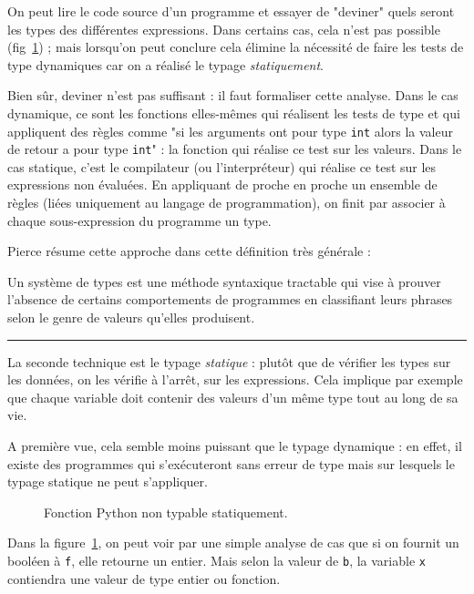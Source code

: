 
On peut lire le code source d'un programme et essayer de "deviner" quels seront
les types des différentes expressions. Dans certains cas, cela n'est pas
possible (fig~\ref{fig:nontypable}) ; mais lorsqu'on peut conclure cela élimine
la nécessité de faire les tests de type dynamiques car on a réalisé le typage
\emph{statiquement}.

Bien sûr, deviner n'est pas suffisant : il faut formaliser cette analyse. Dans
le cas dynamique, ce sont les fonctions elles-mêmes qui réalisent les tests de
type et qui appliquent des règles comme "si les arguments ont pour type
\texttt{int} alors la valeur de retour a pour type \texttt{int}" : la fonction
qui réalise ce test sur les valeurs. Dans le cas statique, c'est le compilateur
(ou l'interpréteur) qui réalise ce test sur les expressions non évaluées. En
appliquant de proche en proche un ensemble de règles (liées uniquement au
langage de programmation), on finit par associer à chaque sous-expression du
programme un type.

Pierce résume cette approche dans cette définition très générale :

\begin{definition}
Un système de types est une méthode syntaxique tractable qui vise à prouver
l'absence de certains comportements de programmes en classifiant leurs phrases
selon le genre de valeurs qu'elles produisent. \cite{TAPL}
\end{definition}

\begin{center}\rule{3in}{0.4pt}\end{center}

La seconde technique est le typage \emph{statique} : plutôt que de vérifier les
types sur les données, on les vérifie à l'arrêt, sur les expressions. Cela
implique par exemple que chaque variable doit contenir des valeurs d'un même
type tout au long de sa vie.

A première vue, cela semble moins puissant que le typage dynamique : en effet,
il existe des programmes qui s'exécuteront sans erreur de type mais sur lesquels
le typage statique ne peut s'appliquer.

\begin{figure}
  \caption{Fonction Python non typable statiquement.}
  \label{fig:nontypable}
\end{figure}

Dans la figure~\ref{fig:nontypable}, on peut voir par une simple analyse de cas
que si on fournit un booléen à \texttt{f}, elle retourne un entier. Mais selon
la valeur de \texttt{b}, la variable \texttt{x} contiendra une valeur de type
entier ou fonction.

